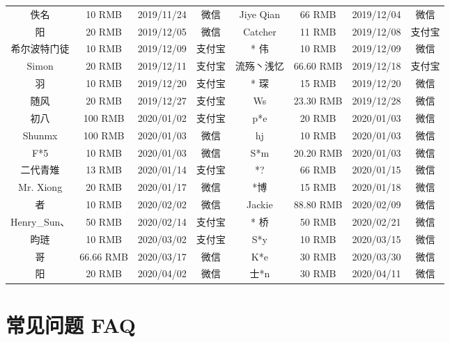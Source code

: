 \documentclass[lang=cn,11pt,a4paper,cite=authoryear]{elegantpaper}
\begin{document}
\begin{table}[!htb]
\begin{tabular}{*{4}{>{\scriptsize}c}|*{4}{>{\scriptsize}c}}
    佚名    & 10 RMB & 2019/11/24 & 微信    & Jiye Qian & 66 RMB & 2019/12/04 & 微信 \\
    * 阳   & 20 RMB & 2019/12/05 & 微信    & Catcher & 11 RMB & 2019/12/08 & 支付宝 \\
    希尔波特门徒 & 10 RMB & 2019/12/09 & 支付宝   & * 伟   & 10 RMB & 2019/12/09 & 微信 \\
    Simon & 20 RMB & 2019/12/11 & 支付宝   & 流殇丶浅忆 & 66.60 RMB & 2019/12/18 & 支付宝 \\
    羽     & 10 RMB & 2019/12/20 & 支付宝   & * 琛   & 15 RMB & 2019/12/20 & 微信 \\
    随风    & 20 RMB & 2019/12/27 & 支付宝   & Ws    & 23.30 RMB & 2019/12/28 & 微信 \\
    初八    & 100 RMB  & 2020/01/02 & 支付宝   & p*e   & 20 RMB & 2020/01/03 & 微信 \\
    Shunmx & 100 RMB & 2020/01/03 & 微信    & hj    & 10 RMB & 2020/01/03 & 微信 \\
    F*5   & 10 RMB & 2020/01/03 & 微信    & S*m   & 20.20 RMB & 2020/01/03 & 微信 \\
    二代青雉  & 13 RMB & 2020/01/14 & 支付宝   & *?    & 66 RMB & 2020/01/15 & 微信 \\
    Mr. Xiong & 20 RMB & 2020/01/17 & 微信    & *博    & 15 RMB & 2020/01/18 & 微信 \\
    * 者  & 10 RMB & 2020/02/02 & 微信    & Jackie  &  88.80 RMB  &  2020/02/09 & 微信 \\
    Henry\_Sun、 & 50 RMB & 2020/02/14 & 支付宝 & * 桥  & 50 RMB & 2020/02/21 & 微信 \\
    昀琏 & 10 RMB & 2020/03/02 & 支付宝 & S*y  &  10 RMB  &  2020/03/15 & 微信 \\
    * 哥  & 66.66 RMB & 2020/03/17 & 微信    &   K*e & 30 RMB & 2020/03/30 & 微信\\
    * 阳  &  20 RMB  &  2020/04/02 & 微信 & 士*n  & 30 RMB & 2020/04/11 & 微信 \\
    \hline
    \end{tabular}%
  \label{tab:donation}%
\end{table}%

\section{常见问题 FAQ}
\end{document}
